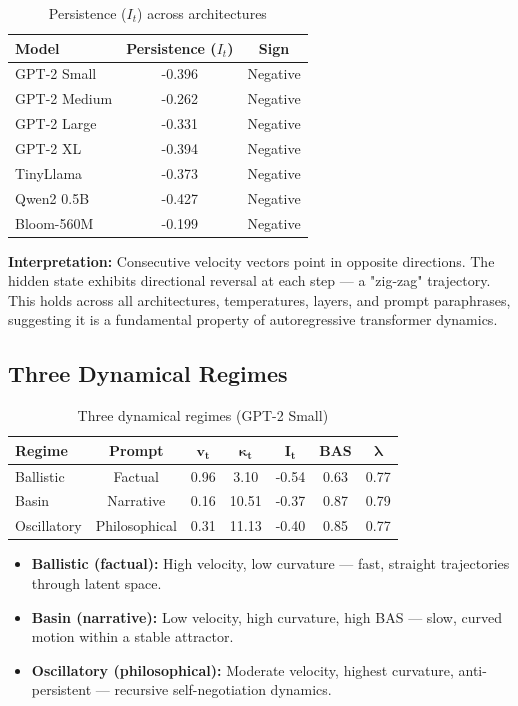 \documentclass[12pt,a4paper]{article}
\begin{document}
\begin{table}[h]
\centering
\caption{Persistence ($I_t$) across architectures}
\begin{tabular}{lcc}
\toprule
\textbf{Model} & \textbf{Persistence ($I_t$)} & \textbf{Sign} \\
\midrule
GPT-2 Small & -0.396 & Negative \\
GPT-2 Medium & -0.262 & Negative \\
GPT-2 Large & -0.331 & Negative \\
GPT-2 XL & -0.394 & Negative \\
TinyLlama & -0.373 & Negative \\
Qwen2 0.5B & -0.427 & Negative \\
Bloom-560M & -0.199 & Negative \\
\bottomrule
\end{tabular}
\end{table}

\textbf{Interpretation:} Consecutive velocity vectors point in opposite directions. The hidden state exhibits directional reversal at each step — a "zig-zag" trajectory. This holds across all architectures, temperatures, layers, and prompt paraphrases, suggesting it is a fundamental property of autoregressive transformer dynamics.

\subsection{Three Dynamical Regimes}

\begin{table}[h]
\centering
\caption{Three dynamical regimes (GPT-2 Small)}
\begin{tabular}{lcccccc}
\toprule
\textbf{Regime} & \textbf{Prompt} & $\mathbf{v_t}$ & $\mathbf{\kappa_t}$ & $\mathbf{I_t}$ & \textbf{BAS} & $\mathbf{\lambda}$ \\
\midrule
Ballistic & Factual & 0.96 & 3.10 & -0.54 & 0.63 & 0.77 \\
Basin & Narrative & 0.16 & 10.51 & -0.37 & 0.87 & 0.79 \\
Oscillatory & Philosophical & 0.31 & 11.13 & -0.40 & 0.85 & 0.77 \\
\bottomrule
\end{tabular}
\end{table}

\begin{itemize}[noitemsep]
    \item \textbf{Ballistic (factual):} High velocity, low curvature — fast, straight trajectories through latent space.
    \item \textbf{Basin (narrative):} Low velocity, high curvature, high BAS — slow, curved motion within a stable attractor.
    \item \textbf{Oscillatory (philosophical):} Moderate velocity, highest curvature, anti-persistent — recursive self-negotiation dynamics.
\end{itemize}
\end{document}
